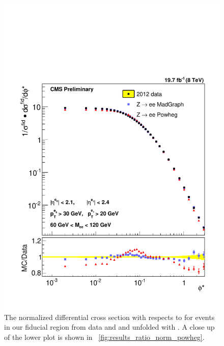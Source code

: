 \begin{figure}[!htbp]
    \centering
    \includegraphics[width=\textwidth]{figures/ZShape_elec_PH_Norm_Dressed.pdf}
    \caption[
        The normalized differential cross section with respects to \phistar for
        \Ztoee events in our fiducial region from data and \MADGRAPH and
        \POWHEG unfolded with \POWHEG.
    ]{
        The normalized differential cross section with respects to \phistar for
        \Ztoee events in our fiducial region from data and \MADGRAPH and
        \POWHEG unfolded with \POWHEG. A close up of the lower plot is shown in
        \FIG~\ref{fig:results_ratio_norm_powheg}.
    }
    \label{fig:results_norm_powheg}
\end{figure}

